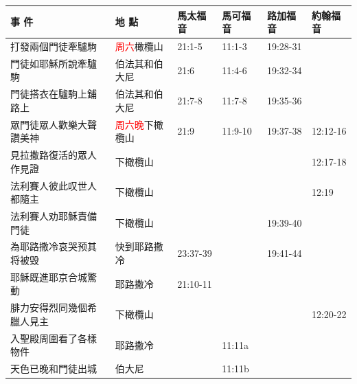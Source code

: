 \begin{table}[H] \centering
 \begin{tabular}{p{14em}|p{7.93em}|l|l|l|p{4.855em}} \toprule
\textbf{事 件} & \textbf{地 點} & \multicolumn{1}{p{5.285em}|}{\textbf{馬太福音}} & \multicolumn{1}{p{5.57em}|}{\textbf{馬可福音}} & \multicolumn{1}{p{5.285em}|}{\textbf{路加福音}} & \textbf{約翰福音} \\  \midrule
打發兩個門徒牽驢駒 &\textcolor{red}{周六}橄欖山&21:1-5 &  11:1-3   &19:28-31&  \\\midrule
門徒如耶穌所說牽驢駒 &伯法其和伯大尼& 21:6&  11:4-6     &19:32-34&  \\\midrule

門徒搭衣在驢駒上鋪路上&伯法其和伯大尼& 21:7-8&  11:7-8     &19:35-36& \\\midrule

眾門徒眾人歡樂大聲讚美神&\textcolor{red}{周六晚}下橄欖山& 21:9&11:9-10 &19:37-38&12:12-16\\\midrule
見拉撒路復活的眾人作見證&下橄欖山& &&&12:17-18\\\midrule
法利賽人彼此叹世人都隨主&下橄欖山&       &       && 12:19\\\midrule
法利賽人劝耶穌責備門徒&下橄欖山&       &       &19:39-40&  \\\midrule

為耶路撒冷哀哭预其将被毁 &快到耶路撒冷& 23:37-39 &       &19:41-44&  \\\midrule
耶穌既進耶京合城驚動&耶路撒冷& 21:10-11&   &&  \\\midrule
腓力安得烈同幾個希臘人見主&下橄欖山&       &       &&12:20-22\\\midrule

入聖殿周圍看了各樣物件&耶路撒冷& & 11:11a&&  \\\midrule
天色已晚和門徒出城&伯大尼& &11:11b &&  \\\midrule
\end{tabular}%
\end{table}%

